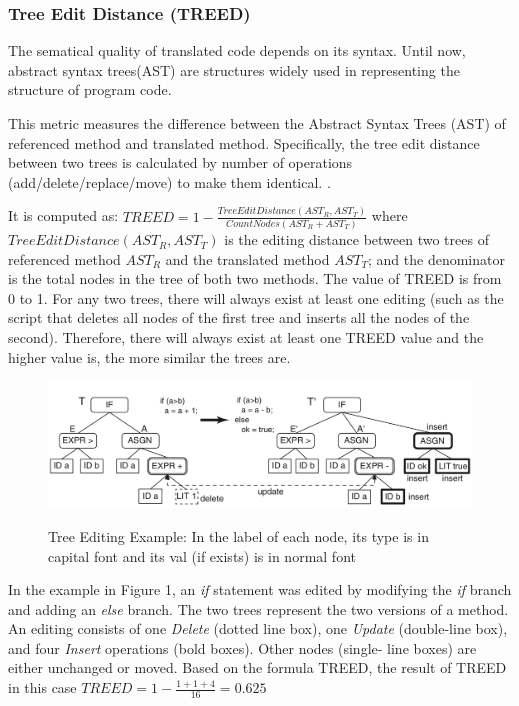 \subsubsection{\textbf{Tree Edit Distance (TREED)}}  
The sematical quality of translated code depends on its syntax. Until now, abstract syntax trees(AST) are structures widely used in  representing the structure of program code. 

This metric measures the difference between the Abstract Syntax Trees (AST) of referenced method and translated method. Specifically, the tree edit distance between two trees is calculated by number of operations (add/delete/replace/move) to make them identical. \cite{algorithm}. 

It is computed as:  $TREED = 1 -  \frac{TreeEditDistance\left(AST_R, AST_T\right)}{CountNodes \left(AST_R+AST_T\right)}$ where $TreeEditDistance\left(AST_R, AST_T\right)$ is the editing distance between two trees of referenced method $AST_R$ and the translated method $AST_T$; and the denominator is the total nodes in the tree of both two methods. The value of TREED is from 0 to 1. For any two trees, there will always exist at least one editing (such as the script that deletes all nodes of the first tree and inserts all the nodes of the second). Therefore, there will always exist at least one TREED value and the higher value is, the more similar the trees are.

\begin{figure}[h]
	\caption{Tree Editing Example: In the label of each node, its type is in capital font and its val (if exists) is in normal font}
	\includegraphics[scale=0.3]{img/treed.png}
	\centering
	\label{fig:treed}
\end{figure}

In the example in Figure 1, an \textit{if} statement was edited by modifying the \textit{if} branch and adding an \textit{else} branch. The two trees represent the two versions of a method. An editing consists of one \textit{Delete} (dotted line box), one \textit{Update} (double-line box), and four \textit{Insert} operations (bold boxes). Other nodes (single- line boxes) are either unchanged or moved. Based on the formula TREED, the result of TREED in this case  $TREED = 1 - \frac{1 + 1 + 4}{16}=0.625$




